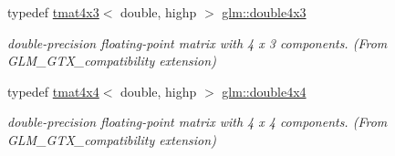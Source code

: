 \begin{DoxyCompactItemize}
typedef \hyperlink{structglm_1_1tmat4x3}{tmat4x3}$<$ double, highp $>$ \hyperlink{group__gtx__compatibility_gadad0d5da7181385a05567469d4a5dd9a}{glm\+::double4x3}
\begin{DoxyCompactList}\small\item\em double-\/precision floating-\/point matrix with 4 x 3 components. (From G\+L\+M\+\_\+\+G\+T\+X\+\_\+compatibility extension) \end{DoxyCompactList}\item 
\mbox{\label{group__gtx__compatibility_ga83ac0f28025f5e999b03094400fbddcb}} 
typedef \hyperlink{structglm_1_1tmat4x4}{tmat4x4}$<$ double, highp $>$ \hyperlink{group__gtx__compatibility_ga83ac0f28025f5e999b03094400fbddcb}{glm\+::double4x4}
\begin{DoxyCompactList}\small\item\em double-\/precision floating-\/point matrix with 4 x 4 components. (From G\+L\+M\+\_\+\+G\+T\+X\+\_\+compatibility extension) \end{DoxyCompactList}\end{DoxyCompactItemize}

